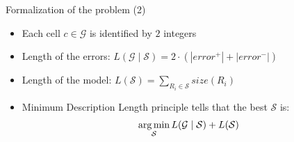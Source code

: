 \documentclass[10pt]{beamer}
\begin{document}
\begin{frame}{Formalization of the problem (2)}
    \begin{itemize}
        \item Each cell $c \in \mathcal{G}$ is identified by $2$ integers
        \item Length of the errors: $L(\mathcal{G}\mid \mathcal{S}) = 2 \cdot (|error^+| + |error^-|)$
        \item Length of the model: $L(\mathcal{S}) = \sum_{R_i \in \mathcal{S}} size(R_i)$
        \item Minimum Description Length principle tells that the best $\mathcal{S}$ is:
            \begin{equation*}
                \operatorname*{arg\,min}_{\mathcal{S}} L(\mathcal{G} \mid \mathcal{S}) + L(\mathcal{S})
            \end{equation*}
    \end{itemize}
\end{frame}
\end{document}
